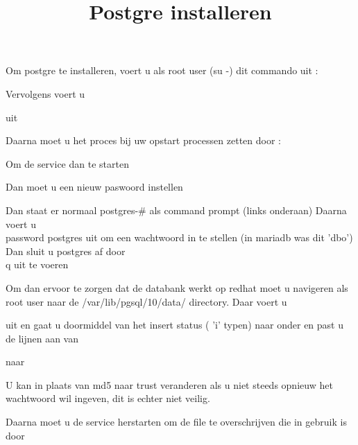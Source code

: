 \documentclass[fleqn,10pt]{artikeltin}
\begin{document}
{\title{Postgre installeren}

Om postgre te installeren, voert u als root user (su -) dit commando uit :
 
   \par

Vervolgens voert u
  \par
  \par
  \par
uit

Daarna moet u het proces bij uw opstart processen zetten door :

 \par 

Om de service dan te starten
 \par

Dan moet u een nieuw paswoord instellen 
  \par
 
Dan staat er normaal postgres-\# als command prompt (links onderaan)
Daarna voert u \\password postgres uit om een wachtwoord in te stellen (in mariadb was dit 'dbo')
Dan sluit u postgres af door \\q uit te voeren

Om dan ervoor te zorgen dat de databank werkt op redhat moet u navigeren als root user naar de 
/var/lib/pgsql/10/data/ directory.
Daar voert u 
  \par
  
uit en gaat u doormiddel van het insert status ( 'i' typen) naar onder en past u de lijnen aan van 
  \par
naar 
  \par
 
U kan in plaats van md5 naar trust veranderen als u niet steeds opnieuw het wachtwoord wil ingeven,
dit is echter niet veilig.

Daarna moet u de service herstarten om de file te overschrijven die in gebruik is door 
  \par

}
\end{document}
